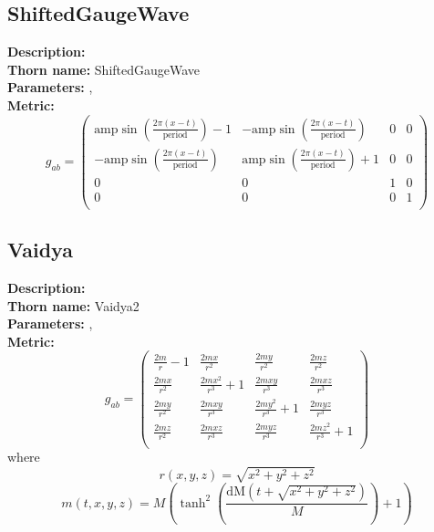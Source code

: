 \documentclass{article}
\begin{document}
\subsection{ShiftedGaugeWave}
{\bf Description:}   \\
{\bf Thorn name:} ShiftedGaugeWave \\
{\bf Parameters:} ,  \\
{\bf Metric:} \\
\begin{equation}
g_{ab} =
\left(
\begin{array}{cccc}
 \text{amp} \sin \left(\frac{2 \pi  (x-t)}{\text{period}}\right)-1 & -\text{amp} \sin \left(\frac{2 \pi  (x-t)}{\text{period}}\right) & 0 & 0 \\
 -\text{amp} \sin \left(\frac{2 \pi  (x-t)}{\text{period}}\right) & \text{amp} \sin \left(\frac{2 \pi  (x-t)}{\text{period}}\right)+1 & 0 & 0 \\
 0 & 0 & 1 & 0 \\
 0 & 0 & 0 & 1 \\
\end{array}
\right)
\end{equation}

\subsection{Vaidya}
{\bf Description:}   \\
{\bf Thorn name:} Vaidya2 \\
{\bf Parameters:} ,  \\
{\bf Metric:} \\
\begin{equation}
g_{ab} =
\left(
\begin{array}{cccc}
 \frac{2 m}{r}-1 & \frac{2 m x}{r^2} & \frac{2 m y}{r^2} & \frac{2 m z}{r^2} \\
 \frac{2 m x}{r^2} & \frac{2 m x^2}{r^3}+1 & \frac{2 m x y}{r^3} & \frac{2 m x z}{r^3} \\
 \frac{2 m y}{r^2} & \frac{2 m x y}{r^3} & \frac{2 m y^2}{r^3}+1 & \frac{2 m y z}{r^3} \\
 \frac{2 m z}{r^2} & \frac{2 m x z}{r^3} & \frac{2 m y z}{r^3} & \frac{2 m z^2}{r^3}+1 \\
\end{array}
\right)
\end{equation}
where
\begin{equation}
r(x,y,z)=\sqrt{x^2+y^2+z^2}
\end{equation}
\begin{equation}
m(t,x,y,z)=M \left(\tanh ^2\left(\frac{\text{dM} \left(t+\sqrt{x^2+y^2+z^2}\right)}{M}\right)+1\right)
\end{equation}
\end{document}
